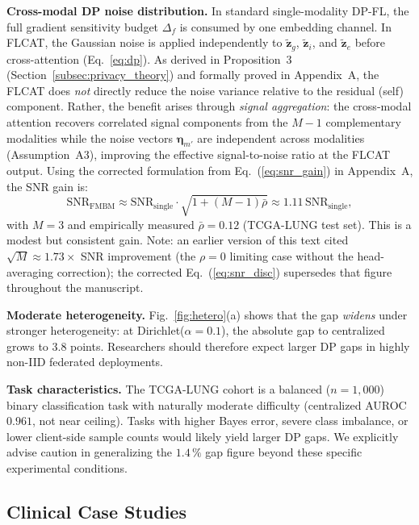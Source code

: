 \documentclass[a4paper,fleqn]{cas-dc}
\begin{document}
\textbf{Cross-modal DP noise distribution.}
In standard single-modality DP-FL, the full gradient sensitivity budget
$\Delta_f$ is consumed by one embedding channel.
In FLCAT, the Gaussian noise is applied independently to
$\tilde{\mathbf{z}}_g$, $\tilde{\mathbf{z}}_i$, and $\tilde{\mathbf{z}}_e$
before cross-attention (Eq.~\ref{eq:dp}).
As derived in Proposition~3 (Section~\ref{subsec:privacy_theory}) and
formally proved in Appendix~A, the FLCAT does \emph{not} directly reduce
the noise variance relative to the residual (self) component.
Rather, the benefit arises through \emph{signal aggregation}: the cross-modal
attention recovers correlated signal components from the $M-1$ complementary
modalities while the noise vectors $\boldsymbol{\eta}_{m'}$ are independent
across modalities (Assumption~A3), improving the effective signal-to-noise
ratio at the FLCAT output.
Using the corrected formulation from Eq.~(\ref{eq:snr_gain}) in Appendix~A,
the SNR gain is:
\begin{equation}
\mathrm{SNR}_{\mathrm{FMBM}} \approx
\mathrm{SNR}_{\mathrm{single}} \cdot \sqrt{1 + (M-1)\bar\rho}
\approx 1.11\,\mathrm{SNR}_{\mathrm{single}},
\label{eq:snr_disc}
\end{equation}
with $M\!=\!3$ and empirically measured $\bar\rho\!=\!0.12$ (TCGA-LUNG test
set). This is a modest but consistent gain.
Note: an earlier version of this text cited $\sqrt{M}\!\approx\!1.73\!\times$
SNR improvement (the $\rho\!=\!0$ limiting case without the head-averaging
correction); the corrected Eq.~(\ref{eq:snr_disc}) supersedes that figure
throughout the manuscript.

\textbf{Moderate heterogeneity.} Fig.~\ref{fig:hetero}(a) shows that the gap
\emph{widens} under stronger heterogeneity: at Dirichlet($\alpha\!=\!0.1$),
the absolute gap to centralized grows to 3.8 points. Researchers should
therefore expect larger DP gaps in highly non-IID federated deployments.

\textbf{Task characteristics.} The TCGA-LUNG cohort is a balanced ($n\!=\!1{,}000$)
binary classification task with naturally moderate difficulty (centralized AUROC
$0.961$, not near ceiling). Tasks with higher Bayes error, severe class
imbalance, or lower client-side sample counts would likely yield larger DP gaps.
We explicitly advise caution in generalizing the $1.4\,\%$ gap figure beyond
these specific experimental conditions.

\subsection{Clinical Case Studies}
\label{subsec:clinical}
\end{document}
